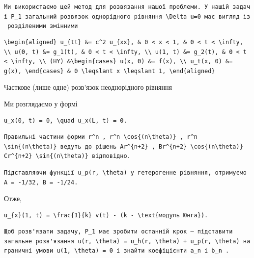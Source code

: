 \documentclass[
  ukrainian,
]{article}
\begin{document}
\texttt{Ми\ використаємо\ цей\ метод\ для\ розв\textquotesingle{}язання\ нашої\ проблеми.\ У\ нашій\ задачі\ \textquotesingle{}P\_1\textquotesingle{}\ загальний\ розв\textquotesingle{}язок\ однорідного\ рівняння\ \textquotesingle{}\textbackslash{}Delta\ u=0\textquotesingle{}\ має\ вигляд\ із\ розділеними\ змінними}

\begin{verbatim}
\begin{aligned} u_{tt} &= c^2 u_{xx}, & 0 < x < 1, & 0 < t < \infty, \\ u(0, t) &= g_1(t), & 0 < t < \infty, \\ u(1, t) &= g_2(t), & 0 < t < \infty, \\ (HY) &\begin{cases} u(x, 0) &= f(x), \\ u_t(x, 0) &= g(x), \end{cases} & 0 \leqslant x \leqslant 1, \end{aligned}
\end{verbatim}

Часткове (лише одне) розв'язок неоднорідного рівняння

Ми розглядаємо у формі

\begin{verbatim}
u_x(0, t) = 0, \quad u_x(L, t) = 0.
\end{verbatim}

\begin{verbatim}
Правильні частини форми r^n , r^n \cos{(n\theta)} , r^n \sin{(n\theta)} ведуть до рішень Ar^{n+2} , Br^{n+2} \cos{(n\theta)} Cr^{n+2} \sin{(n\theta)} відповідно.
\end{verbatim}

\begin{verbatim}
Підставляючи функції u_p(r, \theta) у гетерогенне рівняння, отримуємо A = -1/32, B = -1/24.
\end{verbatim}

Отже,

\begin{verbatim}
u_{x}(1, t) = \frac{1}{k} v(t) - (k - \text{модуль Юнга}).
\end{verbatim}

\begin{verbatim}
Щоб розв'язати задачу, P_1 має зробити останній крок — підставити загальне розв'язання u(r, \theta) = u_h(r, \theta) + u_p(r, \theta) на граничні умови u(1, \theta) = 0 і знайти коефіцієнти a_n і b_n .
\end{verbatim}
\end{document}
